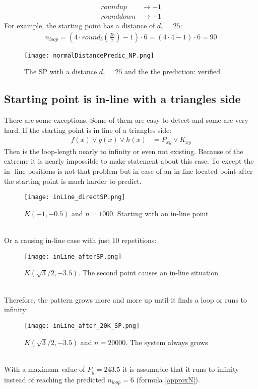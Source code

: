 \documentclass[11pt,a4paper]{article}
\begin{document}
\begin{align}
round up &\rightarrow -1\\
round down &\rightarrow +1 
\end{align}
For example, the starting point has a distance of \(d_1=25\):
\begin{align}
n_{loop}= \left(4 \cdot round_b \left( \frac{25}{7} \right) -1 \right) \cdot 6 = \left(4 \cdot 4 -1 \right) \cdot 6 = 90
\end{align}
\begin{figure}[h]
\centering
\texttt{[image: normalDistancePredic\_NP.png]}
\caption{The SP with a distance \(d_1=25\) and the the prediction: verified}
\end{figure}

\subsection{Starting point is in-line with a triangles side}
There are some exceptions. Some of them are easy to detect and some are very hard. If the starting point is in line of a triangles side:
\begin{align}
f(x) \lor g(x) \lor h(x) &= P_{xy} \lor K_{xy}
\end{align}
Then is the loop-length nearly to infinity or even not existing. Because of the extreme it is nearly impossible to make statement about this case. To except the in- line positions is not that problem but in case of an in-line located point after the starting point is much harder to predict.\\
\pagebreak
\begin{figure}[h]
\centering
\texttt{[image: inLine\_directSP.png]}
\caption{\(K\left(-1,-0.5\right)\) and \(n=1000\). Starting with an in-line point}
\end{figure}
\\Or a causing in-line case with just \(10\) repetitions:\\
\begin{figure}[h]
\centering
\texttt{[image: inLine\_afterSP.png]}
\caption{\(K\left(\sqrt{3}/2,-3.5\right)\). The second point causes an in-line situation}
\end{figure}\\
Therefore, the pattern grows more and more up until it finds a loop or runs to infinity:\\
\begin{figure}[h]
\centering
\texttt{[image: inLine\_after\_20K\_SP.png]}
\caption{\(K\left(\sqrt{3}/2,-3.5\right)\) and \(n=20 000\). The system always grows}
\end{figure}\\
With a maximum value of \(P_y=243.5\) it is assumable that it runs to infinity instead of reaching the predicted \(n_{loop}=6\) (formula \ref{approxN}).
\pagebreak
\end{document}
